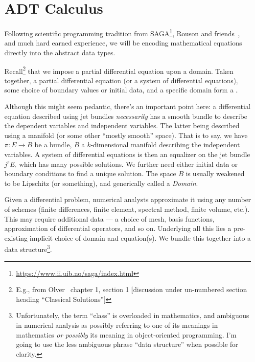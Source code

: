 \section{ADT Calculus}

Following scientific programming tradition from SAGA\footnote{\url{https://www.ii.uib.no/saga/index.html}},
Rouson and friends~\cite{rouson2011scientific,rouson2008grid}, and much
hard earned experience, we will be encoding mathematical equations
directly into the abstract data types.

Recall\footnote{E.g., from Olver~\cite{olver2014introduction} chapter 1,
section 1 [discussion under un-numbered section heading ``Classical
  Solutions'']} that we impose a partial differential equation upon a
domain. Taken together, a partial differential equation (or a system of
differential equations), some choice of boundary values or initial data,
and a specific domain form a .

\begin{rmk}
Although this might seem pedantic, there's an important point here: a
differential equation described using jet bundles \emph{necessarily} has
a smooth bundle to describe the dependent variables and independent
variables. The latter being described using a manifold (or some other
``mostly smooth'' space). That is to say, we have $\pi\colon E\to B$ be
a bundle, $B$ a $k$-dimensional manifold describing the independent
variables. A system of differential equations is then an equalizer
on the jet bundle $j^{r}E$, which has many possible solutions. We
further need either initial data or boundary conditions to find a unique
solution. The space $B$ is usually weakened to be Lipschitz (or
something), and generically called a \emph{Domain}.
\end{rmk}

Given a differential problem, numerical analysts approximate it using
any number of schemes (finite differences, finite element, spectral
method, finite volume, etc.). This may require additional data --- a
choice of mesh, basis functions, approximation of differential
operators, and so on. Underlying all this lies a pre-existing implicit
choice of domain and equation(s). We bundle this together into a
 data structure\footnote{Unfortunately, the term
``class'' is overloaded in mathematics, and ambiguous in numerical
analysis as possibly referring to one of its meanings in mathematics
\emph{or possibly} its meaning in object-oriented programming. I'm going
to use the less ambiguous phrase ``data structure'' when possible for
clarity.}.


